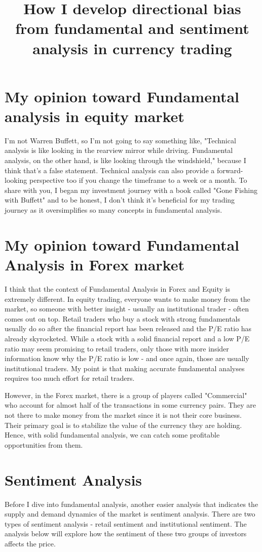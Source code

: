 \documentclass{article}
\title{How I develop directional bias from fundamental and sentiment analysis in currency trading}
\begin{document}
\maketitle

\section{My opinion toward Fundamental analysis in equity market}
I'm not Warren Buffett, so I'm not going to say something like, "Technical analysis is like looking in the rearview mirror while driving. Fundamental analysis, on the other hand, is like looking through the windshield," because I think that's a false statement. Technical analysis can also provide a forward-looking perspective too if you change the timeframe to a week or a month. To share with you, I began my investment journey with a book called "Gone Fishing with Buffett" and to be honest, I don't think it's beneficial for my trading journey as it oversimplifies so many concepts in fundamental analysis. 

\section{My opinion toward Fundamental Analysis in Forex market}
I think that the context of Fundamental Analysis in Forex and Equity is extremely different. In equity trading, everyone wants to make money from the market, so someone with better insight - usually an institutional trader - often comes out on top. Retail traders who buy a stock with strong fundamentals usually do so after the financial report has been released and the P/E ratio has already skyrocketed. While a stock with a solid financial report and a low P/E ratio may seem promising to retail traders, only those with more insider information know why the P/E ratio is low - and once again, those are usually institutional traders. My point is that making accurate fundamental analyses requires too much effort for retail traders.

However, in the Forex market, there is a group of players called "Commercial" who account for almost half of the transactions in some currency pairs. They are not there to make money from the market since it is not their core business. Their primary goal is to stabilize the value of the currency they are holding. Hence, with solid fundamental analysis, we can catch some profitable opportunities from them. 

\section{Sentiment Analysis}
Before I dive into fundamental analysis, another easier analysis that indicates the supply and demand dynamics of the market is sentiment analysis. There are two types of sentiment analysis - retail sentiment and institutional sentiment. The analysis below will explore how the sentiment of these two groups of investors affects the price.
\end{document}
